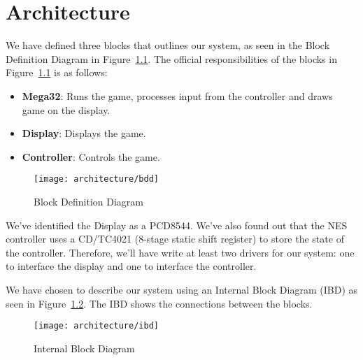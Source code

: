 \chapter{Architecture}

We have defined three blocks that outlines our system, as seen in the Block Definition Diagram in Figure~\ref{fig:bdd}. The official responsibilities of the blocks in Figure~\ref{fig:bdd} is as follows:

\begin{itemize}
	\item \textbf{Mega32}: Runs the game, processes input from the controller and draws game on the display.
	\item \textbf{Display}: Displays the game.
	\item \textbf{Controller}: Controls the game.
\end{itemize}

\begin{figure}
\centering
\texttt{[image: architecture/bdd]}
\caption{Block Definition Diagram}
\label{fig:bdd}
\end{figure}

We've identified the Display as a PCD8544. We've also found out that the NES controller uses a CD/TC4021 (8-stage static shift register) to store the state of the controller. Therefore, we'll have write at least two drivers for our system: one to interface the display and one to interface the controller.

We have chosen to describe our system using an Internal Block Diagram (IBD) as seen in Figure~\ref{fig:ibd}. The IBD shows the connections between the blocks.

\begin{figure}
\centering
\texttt{[image: architecture/ibd]}
\caption{Internal Block Diagram}
\label{fig:ibd}
\end{figure}



